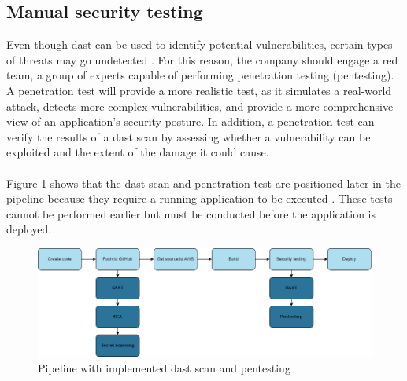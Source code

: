 \subsection{Manual security testing}
Even though \acrshort{dast} can be used to identify potential vulnerabilities, certain types of threats may go undetected \cite{dastpentesting}. For this reason, the company should engage a red team, a group of experts capable of performing penetration testing (pentesting). A penetration test will provide a more realistic test, as it simulates a real-world attack, detects more complex vulnerabilities, and provide a more comprehensive view of an application's security posture. In addition, a penetration test can verify the results of a  \acrshort{dast} scan by assessing whether a vulnerability can be exploited and the extent of the damage it could cause. 
\\~\\
Figure \ref{fig: Pipeline with implemented DAST scan and pentesting} shows that the \acrshort{dast} scan and penetration test are positioned later in the \gls{pipeline} because they require a running application to be executed \cite{dastplacment}. These tests cannot be performed earlier but must be conducted before the application is deployed.
\vspace{2mm}

\begin{figure}[H]
    \centering
    \includegraphics[width=0.8\columnwidth]{Images/pipeline5.png}
    \caption{Pipeline with implemented \acrshort{dast} scan and pentesting}
    \label{fig: Pipeline with implemented DAST scan and pentesting}
\end{figure}
